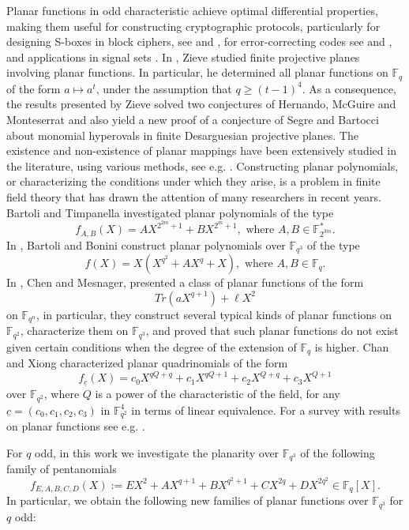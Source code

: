 \documentclass[12pt]{amsart}
\begin{document}
	  Planar functions in odd characteristic achieve optimal differential properties, making them useful for constructing cryptographic protocols, particularly for designing S-boxes in block ciphers, see \cite{nyberg} and \cite{cryp}, for error-correcting codes see \cite{DXYY} and \cite{YCD}, and applications in signal sets \cite{DY}. In \cite{zieve}, Zieve studied finite projective planes involving planar functions. In particular, he determined all planar functions on $\mathbb{F}_q$ of the form $a \mapsto a^t$, under the assumption that $q \geq (t-1)^4$. As a consequence, the results presented by Zieve solved two conjectures of Hernando, McGuire and Monteserrat \cite{HMM} and also yield a new proof of a conjecture of Segre and Bartocci \cite{SB} about monomial hyperovals in finite Desarguesian projective planes. The existence and non-existence of planar mappings have been extensively studied in the literature, using various methods, see e.g. \cite{BN2015, BH2011, CSZ, CM1997, KO2012}. Constructing planar polynomials, or characterizing the conditions under which they arise, is a problem in finite field theory that has drawn the attention of many researchers in recent years. Bartoli and Timpanella \cite{bartoli2} investigated planar polynomials of the type
	   $$f_{A,B}(X) = AX^{2^{2m} +1} + B X^{2^m + 1}, \text{ where } A,B \in \mathbb{F}_{2^{3m}}^{\ast}.$$
	    In \cite{bartoli}, Bartoli and Bonini construct planar polynomials over $\mathbb{F}_{q^3}$ of the type 
	    $$f(X) = X(X^{q^2} + AX^q + X), \text{ where } A,B \in \mathbb{F}_q.$$
	     In \cite{CM}, Chen and Mesnager, presented a class of planar functions of the form $$Tr(aX^{q+1}) + \ell{X^2}$$ on $\mathbb{F}_{q^n}$, in particular, they construct several typical kinds of planar functions on $\mathbb{F}_{q^2}$, characterize them on $\mathbb{F}_{q^3}$, and proved that such planar functions do not exist given certain conditions when the degree of the extension of $\mathbb{F}_q$ is higher. Chan and Xiong \cite{CX} characterized planar quadrinomials of the form $$f_{\underline{c}}(X)=c_0X^{qQ+q}+c_1X^{qQ+1}+c_2X^{Q+q}+c_3X^{Q+1}$$ over $\mathbb{F}_{q^2}$, where $Q$ is a power of the characteristic of the field, for any $\underline{c}=(c_0,c_1,c_2,c_3)$ in $ \mathbb{F}_{q^2}^4$ in terms of linear equivalence. For a survey with results on planar functions see e.g. \cite{pott}. 
	  
	  For $q$ odd, in this work  we investigate the planarity over $\mathbb{F}_{q^3}$ of the following family of pentanomials 
	  $$f_{E,A,B,C,D}(X) := EX^2+AX^{q+1}+ BX^{q^2+1}+CX^{2q} +DX^{2q^2} \in \mathbb{F}_{q}[X].$$
	  In particular, we obtain the following new  families of planar functions over $\mathbb{F}_{q^3}$ for $q$ odd:
	  
\end{document}
